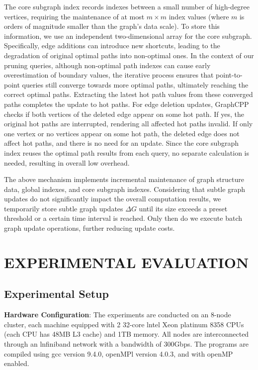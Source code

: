 \documentclass[lettersize,journal]{IEEEtran} %
\begin{document}
The core subgraph index records indexes between a small number of high-degree vertices, requiring the maintenance of at most $m \times m$ index values (where $m$ is orders of magnitude smaller than the graph's data scale). To store this information, we use an independent two-dimensional array for the core subgraph. Specifically, edge additions can introduce new shortcuts, leading to the degradation of original optimal paths into non-optimal ones. In the context of our pruning queries, although non-optimal path indexes can cause early overestimation of boundary values, the iterative process ensures that point-to-point queries still converge towards more optimal paths, ultimately reaching the correct optimal paths. Extracting the latest hot path values from these converged paths completes the update to hot paths. For edge deletion updates, GraphCPP checks if both vertices of the deleted edge appear on some hot path. If yes, the original hot paths are interrupted, rendering all affected hot paths invalid. If only one vertex or no vertices appear on some hot path, the deleted edge does not affect hot paths, and there is no need for an update. Since the core subgraph index reuses the optimal path results from each query, no separate calculation is needed, resulting in overall low overhead.

The above mechanism implements incremental maintenance of graph structure data, global indexes, and core subgraph indexes. Considering that subtle graph updates do not significantly impact the overall computation results, we temporarily store subtle graph updates $\Delta G$ until its size exceeds a preset threshold or a certain time interval is reached. Only then do we execute batch graph update operations, further reducing update costs.

\section{EXPERIMENTAL EVALUATION}
\subsection{Experimental Setup}

{\bf{Hardware Configuration}}: The experiments are conducted on an 8-node cluster, each machine equipped with 2 32-core lntel Xeon platinum 8358 CPUs (each CPU has 48MB L3 cache) and 1TB memory. All nodes are interconnected through an lnfiniband network with a bandwidth of 300Gbps. The programs are compiled using gcc version 9.4.0, openMPl version 4.0.3, and with openMP enabled.
    
\end{document}
